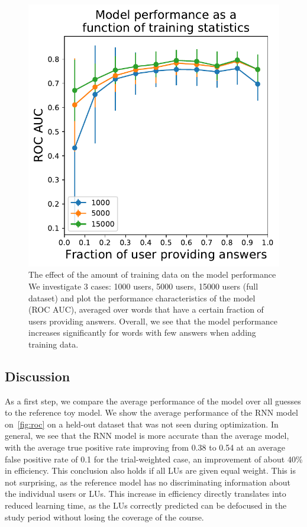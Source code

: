 \begin{figure}[ht]
\centering
\includegraphics[width=0.5\linewidth]{figures/lingvist/statistics.pdf}
\caption[The effect of training statistics on the model performance.]{The effect of the amount of training data on the model performance We investigate 3 cases: 1000 users, 5000 users, 15000 users (full dataset) and plot the performance characteristics of the model (ROC AUC), averaged over words that have a certain fraction of users providing answers. Overall, we see that the model performance increases significantly for words with few answers when adding training data.}
\label{fig:statistics}
\end{figure}

\subsection{Discussion}

As a first step, we compare the average performance of the model over all guesses to the reference toy model. We show the average performance of the RNN model on~\cref{fig:roc} on a held-out dataset that was not seen during optimization. In general, we see that the RNN model is more accurate than the average model, with the average true positive rate improving from 0.38 to 0.54 at an average false positive rate of 0.1 for the trial-weighted case, an improvement of about 40\% in efficiency. This conclusion also holds if all LUs are given equal weight. This is not surprising, as the reference model has no discriminating information about the individual users or LUs. This increase in efficiency directly translates into reduced learning time, as the LUs correctly predicted can be defocused in the study period without losing the coverage of the course.

